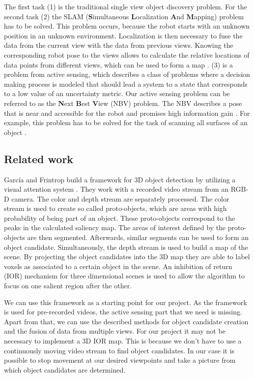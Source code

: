 \documentclass[a4paper,11pt,english]{article}
\begin{document}
The first task (1) is the traditional single view object discovery problem. 
For the second task (2) the SLAM (\textbf{S}imultaneous \textbf{L}ocalization \textbf{A}nd \textbf{M}apping) problem has to be solved.
This problem occurs, because the robot starts with an unknown position in an unknown environment. 
Localization is then necessary to fuse the data from the current view with the data from previous views. 
Knowing the corresponding robot pose to the views allows to calculate the relative locations of data points from different views, which can be used to form a map \cite{surmann2003autonomous}. 
(3) is a problem from active sensing, which describes a class of problems where a decision making process is modeled that should lead a system to a state that corresponds to a low value of an uncertainty metric.
Our active sensing problem can be referred to as the \textbf{N}ext \textbf{B}est \textbf{V}iew (NBV) problem.
The NBV describes a pose that is near and accessible for the robot and promises high information gain \cite{surmann2003autonomous}.
For example, this problem has to be solved for the task of scanning all surfaces of an object \cite{pito1999solution}.

\subsection{Related work}\label{relatedwork}
García and Frintrop build a framework for 3D object detection by utilizing a visual attention system \cite{garcia2013computational}.
They work with a recorded video stream from an RGB-D camera. The color and depth stream are separately processed. 
The color stream is used to create so called proto-objects, which are areas with high probability of being part of an object. These proto-objects correspond to the peaks in the calculated saliency map. 
The areas of interest defined by the proto-objects are then segmented.
Afterwards, similar segments can be used to form an object candidate.
Simultaneously, the depth stream is used to build a map of the scene.
By projecting the object candidates into the 3D map they are able to label voxels as associated to a certain object in the scene.
An inhibition of return (IOR) mechanism for three dimensional scenes is used to allow the algorithm to focus on one salient region after the other.

We can use this framework as a starting point for our project.
As the framework is used for pre-recorded videos, the active sensing part that we need is missing.
Apart from that, we can use the described methods for object candidate creation and the fusion of data from multiple views.
For our project it may not be necessary to implement a 3D IOR map. This is because we don't have to use a continuously moving video stream to find object candidates. In our case it is possible to stop movement at our desired viewpoints and take a picture from which object candidates are determined. \medskip
\end{document}
